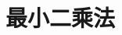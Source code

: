 \documentclass[12pt,a4paper]{article}
\begin{document}
\section{最小二乘法}





















































\end{document}
